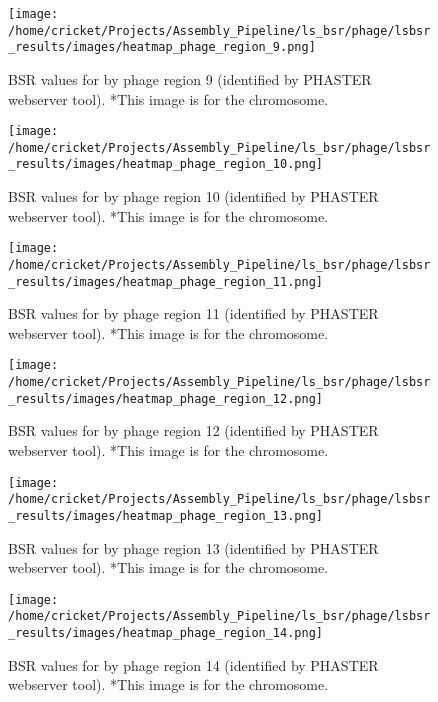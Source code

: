 \documentclass[11pt]{article}
\begin{document}
\begin{figure}[ht!]\normalsize %
\centering
\texttt{[image: /home/cricket/Projects/Assembly\_Pipeline/ls\_bsr/phage/lsbsr\_results/images/heatmap\_phage\_region\_9.png]} 
\caption{BSR values for by phage region 9 (identified by PHASTER webserver tool). *This image is for the chromosome.}
\label{phage_9}
\end{figure}

\clearpage

\begin{figure}[ht!]\normalsize %
\centering
\texttt{[image: /home/cricket/Projects/Assembly\_Pipeline/ls\_bsr/phage/lsbsr\_results/images/heatmap\_phage\_region\_10.png]} 
\caption{BSR values for by phage region 10 (identified by PHASTER webserver tool). *This image is for the chromosome.}
\label{phage_10}
\end{figure}

\begin{figure}[ht!]\normalsize %
\centering
\texttt{[image: /home/cricket/Projects/Assembly\_Pipeline/ls\_bsr/phage/lsbsr\_results/images/heatmap\_phage\_region\_11.png]} 
\caption{BSR values for by phage region 11 (identified by PHASTER webserver tool). *This image is for the chromosome.}
\label{phage_11}
\end{figure}

\clearpage

\begin{figure}[ht!]\normalsize %
\centering
\texttt{[image: /home/cricket/Projects/Assembly\_Pipeline/ls\_bsr/phage/lsbsr\_results/images/heatmap\_phage\_region\_12.png]} 
\caption{BSR values for by phage region 12 (identified by PHASTER webserver tool). *This image is for the chromosome.}
\label{phage_12}
\end{figure}

\begin{figure}[ht!]\normalsize %
\centering
\texttt{[image: /home/cricket/Projects/Assembly\_Pipeline/ls\_bsr/phage/lsbsr\_results/images/heatmap\_phage\_region\_13.png]} 
\caption{BSR values for by phage region 13 (identified by PHASTER webserver tool). *This image is for the chromosome.}
\label{phage_13}
\end{figure}

\clearpage

\begin{figure}[ht!]\normalsize %
\centering
\texttt{[image: /home/cricket/Projects/Assembly\_Pipeline/ls\_bsr/phage/lsbsr\_results/images/heatmap\_phage\_region\_14.png]} 
\caption{BSR values for by phage region 14 (identified by PHASTER webserver tool). *This image is for the chromosome.}
\label{phage_14}
\end{figure}
\end{document}
